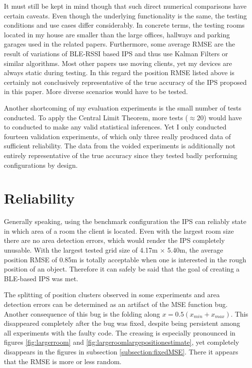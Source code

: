\documentclass[a4paper, oneside]{ipsreport}
\begin{document}
It must still be kept in mind though that such direct numerical comparisons have certain caveats. Even though the underlying functionality is the same, the testing conditions and use cases differ considerably. In concrete terms, the testing rooms located in my house are smaller than the large offices, hallways and parking garages used in the related papers. Furthermore, some average RMSE are the result of variations of BLE-RSSI based IPS and thus use Kalman Filters or similar algorithms. Most other papers use moving clients, yet my devices are always static during testing. In this regard the position RMSE listed above is certainly not conclusively representative of the true accuracy of the IPS proposed in this paper. More diverse scenarios would have to be tested.

Another shortcoming of my evaluation experiments is the small number of tests conducted. To apply the Central Limit Theorem, more tests ($\approx 20$) would have to conducted to make any valid statistical inferences. Yet I only conducted fourteen validation experiments, of which only three really produced data of sufficient reliability. The data from the voided experiments is additionally not entirely representative of the true accuracy since they tested badly performing configurations by design.

\section{Reliability}
Generally speaking, using the benchmark configuration the IPS can reliably state in which area of a room the client is located. Even with the largest room size there are no area detection errors, which would render the IPS completely unusable. With the largest tested grid size of 4.17m $\times$ 5.40m, the average position RMSE of 0.85m is totally acceptable when one is interested in the rough position of an object. Therefore it can safely be said that the goal of creating a BLE-based IPS was met.

The splitting of position clusters observed in some experiments and area detection errors can be determined as an artifact of the MSE function bug. Another consequence of this bug is the folding along $x = 0.5(x_{min} + x_{max})$. This disappeared completely after the bug was fixed, despite being persistent among all experiments with the faulty code. The creasing is especially pronounced in figures \ref{fig:largerroom} and \ref{fig:largeroomlargepositionestimate}, yet completely disappears in the figures in subsection \ref{subsection:fixedMSE}. There it appears that the RMSE is more or less random.
\end{document}
